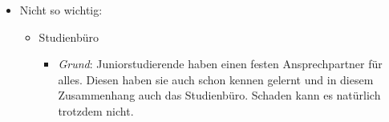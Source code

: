 \documentclass[a4paper,11pt]{scrartcl} %
\newenvironment{myitemize}{\begin{itemize}\itemsep -2pt}{\end{itemize}} %
\begin{document}
\begin{myitemize}
\begin{myitemize}
\begin{myitemize}
				\end{myitemize}
			\item Lernen lernen
				\begin{myitemize}
					\item \textit{Grund}: Lernen an der Uni funktioniert anders als in der Schule. Es ist wichtig dies einmal in einem ungezwungenen Umfeld üben zu können. Keine Angst, alle anderen haben genau so wenig Vorerfahrung mit dem Stoff!
				\end{myitemize}
			\item Studienberatung 2
				\begin{myitemize}
					\item \textit{Grund}: Extra für Juniorstudierende (siehe unten)
				\end{myitemize}
			\item Rallye
				\begin{myitemize}
					\item \textit{Grund}: Vorlesungen werden auch für Juniorstudierende am Hauptcampus stattfinden, daher sollte man sich dort auskennen. Außerdem macht es Spaß!
				\end{myitemize}
			\item Verantwortung (heißt im Stundenplan anders)
		\end{myitemize}
	\item Nicht so wichtig:
		\begin{myitemize}
			\item Studienbüro
				\begin{myitemize}
					\item \textit{Grund}: Juniorstudierende haben einen festen Ansprechpartner für alles. Diesen haben sie auch schon kennen gelernt und in diesem Zusammenhang auch das Studienbüro. Schaden kann es natürlich trotzdem nicht.
				\end{myitemize}
			

\end{myitemize}
\end{myitemize}
\end{document}
